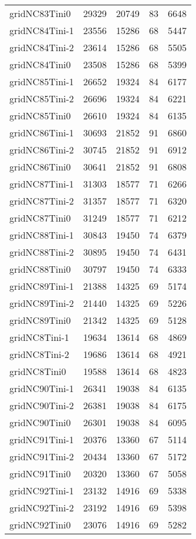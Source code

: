 \begin{longtable}{lrrrr}
gridNC83Tini0 & 29329 & 20749 & 83 & 6648 \\
gridNC84Tini-1 & 23556 & 15286 & 68 & 5447 \\
gridNC84Tini-2 & 23614 & 15286 & 68 & 5505 \\
gridNC84Tini0 & 23508 & 15286 & 68 & 5399 \\
gridNC85Tini-1 & 26652 & 19324 & 84 & 6177 \\
gridNC85Tini-2 & 26696 & 19324 & 84 & 6221 \\
gridNC85Tini0 & 26610 & 19324 & 84 & 6135 \\
gridNC86Tini-1 & 30693 & 21852 & 91 & 6860 \\
gridNC86Tini-2 & 30745 & 21852 & 91 & 6912 \\
gridNC86Tini0 & 30641 & 21852 & 91 & 6808 \\
gridNC87Tini-1 & 31303 & 18577 & 71 & 6266 \\
gridNC87Tini-2 & 31357 & 18577 & 71 & 6320 \\
gridNC87Tini0 & 31249 & 18577 & 71 & 6212 \\
gridNC88Tini-1 & 30843 & 19450 & 74 & 6379 \\
gridNC88Tini-2 & 30895 & 19450 & 74 & 6431 \\
gridNC88Tini0 & 30797 & 19450 & 74 & 6333 \\
gridNC89Tini-1 & 21388 & 14325 & 69 & 5174 \\
gridNC89Tini-2 & 21440 & 14325 & 69 & 5226 \\
gridNC89Tini0 & 21342 & 14325 & 69 & 5128 \\
gridNC8Tini-1 & 19634 & 13614 & 68 & 4869 \\
gridNC8Tini-2 & 19686 & 13614 & 68 & 4921 \\
gridNC8Tini0 & 19588 & 13614 & 68 & 4823 \\
gridNC90Tini-1 & 26341 & 19038 & 84 & 6135 \\
gridNC90Tini-2 & 26381 & 19038 & 84 & 6175 \\
gridNC90Tini0 & 26301 & 19038 & 84 & 6095 \\
gridNC91Tini-1 & 20376 & 13360 & 67 & 5114 \\
gridNC91Tini-2 & 20434 & 13360 & 67 & 5172 \\
gridNC91Tini0 & 20320 & 13360 & 67 & 5058 \\
gridNC92Tini-1 & 23132 & 14916 & 69 & 5338 \\
gridNC92Tini-2 & 23192 & 14916 & 69 & 5398 \\
gridNC92Tini0 & 23076 & 14916 & 69 & 5282 \\

\end{longtable}
